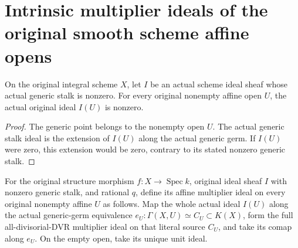 \section{Intrinsic multiplier ideals of the original smooth scheme affine opens}

\begin{lemma}\label{lem:sc0-original-generic-stalk-affine-nonzero}
\leanok
On the original integral scheme $X$, let $I$ be an actual scheme
ideal sheaf whose actual generic stalk is nonzero. For every original
nonempty affine open $U$, the actual original ideal $I(U)$ is nonzero.
\end{lemma}
\begin{proof}
The generic point belongs to the nonempty open $U$. The actual
generic stalk ideal is the extension of $I(U)$ along the actual
generic germ. If $I(U)$ were zero, this extension would be zero,
contrary to its stated nonzero generic stalk.
\end{proof}

\begin{definition}\label{def:sc0-original-scheme-multiplier-affine-ideal}
\leanok
{}
For the original structure morphism $f:X\to\operatorname{Spec} k$,
original ideal sheaf $I$ with nonzero generic stalk, and rational $q$,
define its affine multiplier ideal on every original nonempty affine
$U$ as follows. Map the whole actual ideal $I(U)$ along the actual
generic-germ equivalence $e_U:\Gamma(X,U)\simeq C_U\subset K(X)$,
form the full all-divisorial-DVR multiplier ideal on that literal
source $C_U$, and take its comap along $e_U$. On the empty open,
take its unique unit ideal.
\end{definition}

